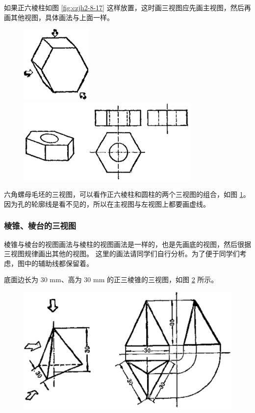 如果正六棱柱如图 \ref{fig:czjh2-8-17} 这样放置，这时画三视图应先画主视图，然后再画其他视图，具体画法与上面一样。

\begin{figure}[htbp]
    \centering
    \begin{minipage}[b]{4cm}
        \centering
        \includegraphics[width=3.5cm]{../pic/czjh2-ch8-17.png}
        \caption{}\label{fig:czjh2-8-17}
    \end{minipage}
    \qquad
    \begin{minipage}[b]{10cm}
        \centering
        \includegraphics[width=9cm]{../pic/czjh2-ch8-18.png}
        \caption{}\label{fig:czjh2-8-18}
    \end{minipage}
\end{figure}

六角螺母毛坯的三视图，可以看作正六棱柱和圆柱的两个三视图的组合，如图 \ref{fig:czjh2-8-18}。
因为孔的轮廓线是看不见的，所以在主视图与左视图上都要画虚线。


\subsubsection{棱锥、棱台的三视图}

棱锥与棱台的视图画法与棱柱的视图画法是一样的，也是先画底的视图，然后很据三视图规律画出其他的视图。
这里的画法请同学们自行分析。为了便于同学们考虑，图中的辅助线都保留着。

底面边长为 30 mm、高为 30 mm 的正三棱锥的三视图，如图 \ref{fig:czjh2-8-19} 所示。

\begin{figure}[H]%
    \centering
    \includegraphics[width=12cm]{../pic/czjh2-ch8-19.png}
    \caption{}\label{fig:czjh2-8-19}
\end{figure}

